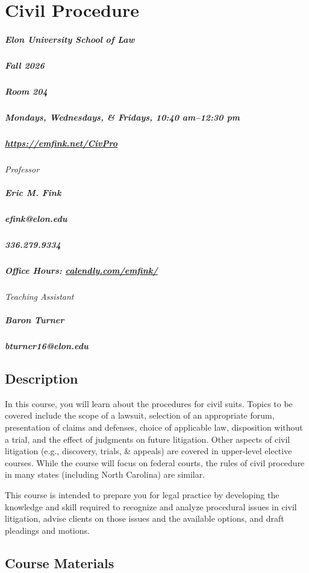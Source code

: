 \documentclass[11pt,letterpaper,twoside]{article}
\begin{document}
\thispagestyle{empty}

\color{OffBlack}

\section{Civil Procedure}

\begin{footnotesize}
\subparagraph{Elon University School of Law}
\subparagraph{Fall 2026}
\subparagraph{Room 204}
\subparagraph{Mondays, Wednesdays, \& Fridays, 10:40 am--12:30 pm}
\subparagraph{\url{https://emfink.net/CivPro}}
\vspace{1em}

{\itshape{Professor}}
\subparagraph{Eric M. Fink} 
\subparagraph{efink@elon.edu}
\subparagraph{336.279.9334} 
\subparagraph{Office Hours: {\url{calendly.com/emfink/}}}
\vspace{1em}
{\itshape{Teaching Assistant}}
\subparagraph{Baron Turner}
\subparagraph{bturner16@elon.edu}
\end{footnotesize}

\vspace{1em}


\subsection*{Description}\label{description}

In this course, you will learn about the procedures for civil suits.
Topics to be covered include the scope of a lawsuit, selection of an
appropriate forum, presentation of claims and defenses, choice of
applicable law, disposition without a trial, and the effect of judgments
on future litigation. Other aspects of civil litigation (e.g.,
discovery, trials, \& appeals) are covered in upper-level elective
courses. While the course will focus on federal courts, the rules of
civil procedure in many states (including North Carolina) are similar.

This course is intended to prepare you for legal practice by developing
the knowledge and skill required to recognize and analyze procedural
issues in civil litigation, advise clients on those issues and the
available options, and draft pleadings and motions.

\subsection*{Course Materials}\label{course-materials}
\end{document}
